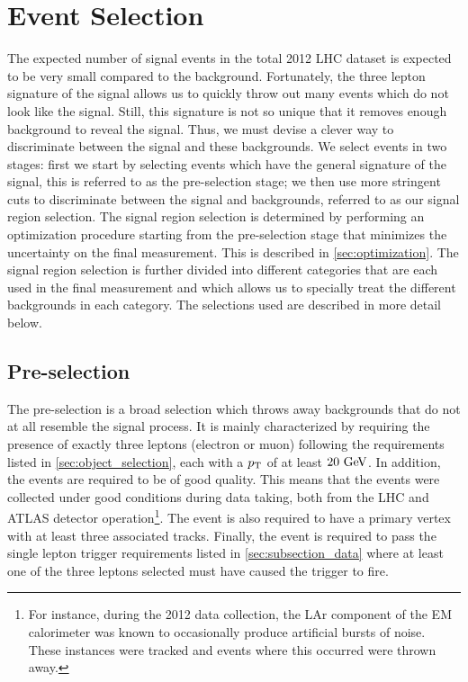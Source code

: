 \section{Event Selection}
\label{sec:event_selection}

The expected number of signal events in the total 2012 LHC 
dataset is expected to be very small compared to the background. %
Fortunately, the three lepton signature of the signal allows us to
quickly throw out many events which do not look like the signal.
Still, this signature is not so unique that 
it removes enough background 
to reveal the signal. 
Thus, we must devise a clever way to discriminate 
between the signal and these backgrounds. We select
events in two stages: first we start
by selecting events which have the general signature of the signal, 
this is referred to as the pre-selection stage; we then 
use more stringent cuts to discriminate between the signal and backgrounds, 
referred to as our signal region selection.
The signal region selection is determined by performing an 
optimization procedure starting from the pre-selection stage 
that minimizes the uncertainty
on the final measurement.  This is described in \sec\ref{sec:optimization}.
The signal region selection is further divided into different
categories that are each used in the final measurement
and which allows us to specially treat the different backgrounds
in each category.  
The selections used are described in more detail below.




\subsection{Pre-selection}
\label{sec:preselection}

The pre-selection is a broad selection which throws
away backgrounds that do not at all resemble the signal process.
It is mainly characterized by requiring the presence of exactly three leptons
(electron or muon) following the requirements listed in 
\sec\ref{sec:object_selection}, each with a $p_{\mathrm{T}}$ of at least $20\GeV$.
In addition, the events are required to be of good quality. This means
that the events were collected under good conditions during data taking,
both from the LHC and ATLAS detector operation\footnote{For instance,
during the 2012 data collection, the LAr component of the EM calorimeter
was known to occasionally produce artificial bursts of noise. These instances
were tracked and events where this occurred were thrown away.}. The event is 
also required to have a primary vertex with at least three associated tracks.
Finally, the event is required to pass the single lepton trigger
requirements listed in \sec\ref{sec:subsection_data} where 
at least one of the three leptons selected must have caused the trigger to fire.



